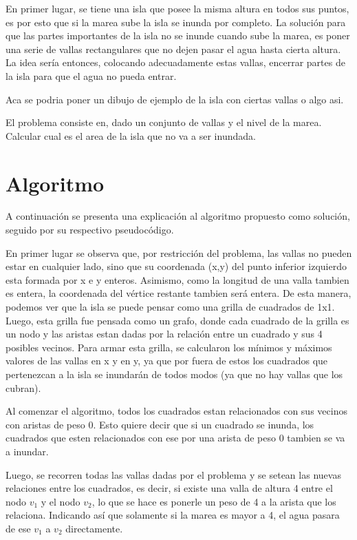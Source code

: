 \documentclass[a4paper, 12pt]{article}
\begin{document}
En primer lugar, se tiene una isla que posee la misma altura en todos sus puntos, es por esto que si la marea sube la isla se inunda por completo. La soluci\'on para que las partes importantes de la isla no se inunde cuando sube la marea, es poner una serie de vallas rectangulares que no dejen pasar el agua hasta cierta altura. La idea ser\'ia entonces, colocando adecuadamente estas vallas, encerrar partes de la isla para que el agua no pueda entrar.

Aca se podria poner un dibujo de ejemplo de la isla con ciertas vallas o algo asi.

El problema consiste en, dado un conjunto de vallas y el nivel de la marea. Calcular cual es el area de la isla que no va a ser inundada.

\section*{Algoritmo}

A continuaci\'on se presenta una explicaci\'on al algoritmo propuesto como soluci\'on, seguido por su respectivo pseudoc\'odigo.

En primer lugar se observa que, por restricci\'on del problema, las vallas no pueden estar en cualquier lado, sino que su coordenada (x,y) del punto inferior izquierdo esta formada por x e y enteros. Asimismo, como la longitud de una valla tambien es entera, la coordenada del v\'ertice restante tambien ser\'a entera. De esta manera, podemos ver que la isla se puede pensar como una grilla de cuadrados de 1x1. Luego, esta grilla fue pensada como un grafo, donde cada cuadrado de la grilla es un nodo y las aristas estan dadas por la relaci\'on entre un cuadrado y sus 4 posibles vecinos. Para armar esta grilla, se calcularon los m\'inimos y m\'aximos valores de las vallas en x y en y, ya que por fuera de estos los cuadrados que pertenezcan a la isla se inundar\'an de todos modos (ya que no hay vallas que los cubran).

Al comenzar el algoritmo, todos los cuadrados estan relacionados con sus vecinos con aristas de peso 0. Esto quiere decir que si un cuadrado se inunda, los cuadrados que esten relacionados con ese por una arista de peso 0 tambien se va a inundar. 

Luego, se recorren todas las vallas dadas por el problema y se setean las nuevas relaciones entre los cuadrados, es decir, si existe una valla de altura 4 entre el nodo $v_1$ y el nodo $v_2$, lo que se hace es ponerle un peso de 4 a la arista que los relaciona. Indicando as\'i que solamente si la marea es mayor a 4, el agua pasara de ese $v_1$ a $v_2$ directamente.
\end{document}
